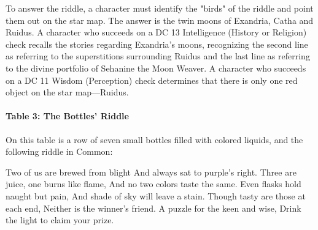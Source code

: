 \documentclass[10pt,a4,twoside,twocolumn,openany,nodeprecatedcode]{dndbook}
\begin{document}
To answer the riddle, a character must identify the "birds" of the riddle and point them out on the star map. The answer is the twin moons of Exandria, Catha and Ruidus.
A character who succeeds on a DC 13 Intelligence (History or Religion) check recalls the stories regarding Exandria's moons, recognizing the second line as referring to the superstitions surrounding Ruidus and the last line as referring to the divine portfolio of Sehanine the Moon Weaver. A character who succeeds on a DC 11 Wisdom (Perception) check determines that there is only one red object on the star map—Ruidus.
\paragraph{Table 3: The Bottles' Riddle}
On this table is a row of seven small bottles filled with colored liquids, and the following riddle in Common:
\begin{DndReadAloud}{}
Two of us are brewed from blight And always sat to purple's right. Three are juice, one burns like flame, And no two colors taste the same. Even flasks hold naught but pain, And shade of sky will leave a stain. Though tasty are those at each end, Neither is the winner's friend. A puzzle for the keen and wise, Drink the light to claim your prize.
\end{DndReadAloud}
\end{document}
